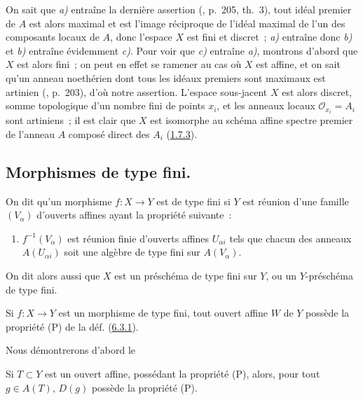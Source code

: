 On sait que \emph{a)} entraîne la dernière assertion (\cite{I-13}, p.~205, th.~3),
tout idéal premier de $A$ est alors maximal et est l'image réciproque de
l'idéal maximal de l'un des composants locaux de $A$, donc l'espace $X$ est
fini et discret~; \emph{a)} entraîne donc \emph{b)} et \emph{b)} entraîne évidemment \emph{c)}. Pour voir
que \emph{c)} entraîne \emph{a)}, montrons d'abord que $X$ est alors fini~; on peut en effet
se ramener au cas où $X$ est affine, et on sait qu'un anneau noethérien dont
tous les idéaux premiers sont maximaux est artinien (\cite{I-13}, p.~203),
d'où notre assertion. L'espace sous-jacent $X$ est alors discret, somme
topologique d'un nombre fini de points $x_i$, et les anneaux locaux
$\mathscr{O}_{x_i}=A_i$ sont artiniens~; il est clair que $X$ est isomorphe au
schéma affine spectre premier de l'anneau $A$ composé direct des $A_i$
(\hyperref[I.1.7.3-fr]{1.7.3}).

\subsection{Morphismes de type fini.}
\label{subsection:I.6.3-fr}

\begin{definition}[6.3.1]
\label{I.6.3.1-fr}
On dit qu'un morphisme $f:X\to Y$ est de type fini si $Y$ est réunion
d'une famille $(V_\alpha)$ d'ouverts affines ayant la propriété suivante~:
\begin{enumerate}
  \item[\textup{(P)}] $f^{-1}(V_\alpha)$ est réunion finie d'ouverts affines
    $U_{\alpha i}$ tels que chacun des anneaux $A(U_{\alpha i})$ soit une
    algèbre de type fini sur $A(V_\alpha)$.
\end{enumerate}
On dit alors aussi que $X$ est un préschéma de type fini sur $Y$, ou un
$Y$-préschéma de type fini.
\end{definition}

\begin{proposition}[6.3.2]
\label{I.6.3.2-fr}
Si $f:X\to Y$ est un morphisme de type fini, tout ouvert affine $W$ de $Y$
possède la propriété \textup{(P)} de la déf. \textup{(\hyperref[I.6.3.1-fr]{6.3.1})}.
\end{proposition}

Nous démontrerons d'abord le

\begin{lemma}[6.3.2.1]
\label{I.6.3.2.1-fr}
Si $T\subset Y$ est un ouvert affine, possédant la propriété \textup{(P)}, alors, pour
tout $g\in A(T)$, $D(g)$ possède la propriété \textup{(P)}.
\end{lemma}

